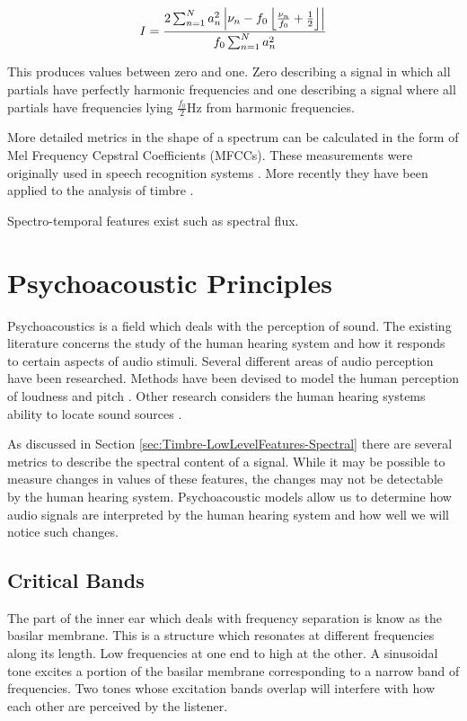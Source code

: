 			\begin{equation}
				I = \frac{2\sum_{n = 1}^{N}a_{n}^{2}
					   \left|\nu_{n} - f_{0}\left\lfloor\frac{\nu_{n}}{f_{0}} + \frac{1}{2}\right\rfloor\right|}
					   {f_{0}\sum_{n = 1}^{N} a_{n}^{2}}
				\label{eq:Inharmonicity}
			\end{equation}

			This produces values between zero and one. Zero describing a signal in which all partials have
			perfectly harmonic frequencies and one describing a signal where all partials have frequencies lying
			$\frac{f_{0}}{2}$Hz from harmonic frequencies.

		\note
		{
			More detailed metrics in the shape of a spectrum can be calculated in the form of Mel Frequency
			Cepstral Coefficients (MFCCs). These measurements were originally used in speech recognition systems
			\citep{davis1980comparison}. More recently they have been applied to the analysis of timbre
			\citep{depoli1997sonological}. 
		}

		\note
		{
			Spectro-temporal features exist such as spectral flux.
		}

\section{Psychoacoustic Principles}
\label{sec:Timbre-PsychoacousticPrinciples}
	Psychoacoustics is a field which deals with the perception of sound. The existing literature concerns the study of
	the human hearing system and how it responds to certain aspects of audio stimuli. Several different areas of audio
	perception have been researched. Methods have been devised to model the human perception of loudness
	\citep{moore1997a} and pitch \citep{gerhard2003pitch}. Other research considers the human hearing systems ability to
	locate sound sources \citep{blauert1997spatial}. 

	As discussed in Section \ref{sec:Timbre-LowLevelFeatures-Spectral} there are several metrics to describe the
	spectral content of a signal. While it may be possible to measure changes in values of these features, the changes
	may not be detectable by the human hearing system. Psychoacoustic models allow us to determine how audio signals are
	interpreted by the human hearing system and how well we will notice such changes.

	\subsection{Critical Bands}
	\label{sec:Timbre-PsychoacousticPrinciples-CriticalBands}
		The part of the inner ear which deals with frequency separation is know as the basilar membrane. This is a
		structure which resonates at different frequencies along its length. Low frequencies at one end to high at
		the other. A sinusoidal tone excites a portion of the basilar membrane corresponding to a narrow band of
		frequencies. Two tones whose excitation bands overlap will interfere with how each other are perceived by
		the listener.

